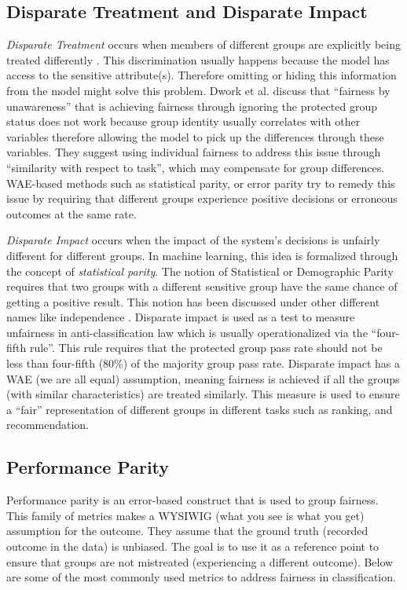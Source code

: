     \subsection{Disparate Treatment and Disparate Impact}
        
        \textit{Disparate Treatment} occurs when members of different groups are explicitly being treated differently \cite{barocas2016big}. This discrimination usually happens because the model has access to the sensitive attribute(s). Therefore omitting or hiding this information from the model might solve this problem.
        Dwork et al. \cite{Dwork2012individual} discuss that ``fairness by unawareness'' that is achieving fairness through ignoring the protected group status does not work because group identity usually correlates with other variables \cite{Feldman2015} therefore allowing the model to pick up the differences through these variables. They suggest using individual fairness to address this issue through ``similarity with respect to task'', which may compensate for group differences. WAE-based methods such as statistical parity, or error parity try to remedy this issue by requiring that different groups experience positive decisions or erroneous outcomes at the same rate.
        
        \textit{Disparate Impact} \cite{Feldman2015} occurs when the impact of the system's decisions is unfairly different for different groups. In machine learning, this idea is formalized through the concept of \textit{statistical parity}. The notion of Statistical or Demographic Parity requires that two groups with a different sensitive group have the same chance of getting a positive result. This notion has been discussed under other different names like independence \cite{barocas2018fairness}. Disparate impact is used as a test to measure unfairness in anti-classification law\cite{corbett2018measure} which is usually operationalized via the ``four-fifth rule''. This rule requires that the protected group pass rate should not be less than four-fifth (80\%) of the majority group pass rate. Disparate impact has a WAE (we are all equal) assumption, meaning fairness is achieved if all the groups (with similar characteristics) are treated similarly. This measure is used to ensure a ``fair'' representation of different groups in different tasks such as ranking\cite{singh2018fairness,zehlike2017fa,yang2017measuring}, and recommendation\cite{mehtora2018towards,ekstrand2018exploring}.
    
    
    \subsection{Performance Parity}
        Performance parity is an error-based construct that is used to group fairness. This family of metrics makes a WYSIWIG (what you see is what you get) assumption for the outcome. They assume that the ground truth (recorded outcome in the data) is unbiased. The goal is to use it as a reference point to ensure that groups are not mistreated (experiencing a different outcome). Below are some of the most commonly used metrics to address fairness in classification.
        
